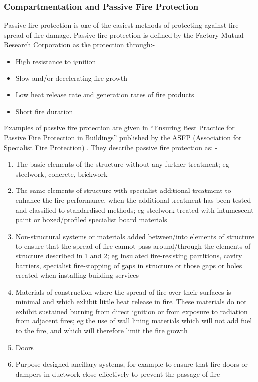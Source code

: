 \documentclass[table,a4paper,oneside]{book}
\begin{document}
\subsubsection{Compartmentation and Passive Fire Protection}
Passive fire protection is one of the easiest methods of protecting against fire spread of fire damage. Passive fire protection is defined by the Factory Mutual Research Corporation \citep{Corporation1991} as the protection through:-
\begin{itemize}
\item High resistance to ignition
\item Slow and/or decelerating fire growth
\item Low heat release rate and generation rates of fire products
\item Short fire duration
\end{itemize}
Examples of passive fire protection are given in ``Ensuring Best Practice for Passive Fire Protection in Buildings'' published by the ASFP (Association for Specialist Fire Protection)  \citep{ASFP2004}. They describe passive fire protection as: -
\begin{enumerate}
\item The basic elements of the structure without any further treatment; eg steelwork, concrete, brickwork
\item The same elements of structure with specialist additional treatment to enhance the fire performance, when the additional treatment has been tested and classified to standardised methods; eg steelwork treated with intumescent paint or boxed/profiled specialist board materials
\item Non-structural systems or materials added between/into elements of structure to ensure that the spread of fire cannot pass around/through the  elements of structure described in 1 and 2; eg insulated fire-resisting partitions, cavity barriers, specialist fire-stopping of gaps in structure or those gaps or holes created when installing building services
\item Materials of construction where the spread of fire over their surfaces is minimal and which exhibit little heat release in fire. These materials do  not exhibit sustained burning from direct ignition or from exposure to radiation from adjacent fires; eg the use of wall lining materials which will not  add fuel to the fire, and which will therefore limit the fire growth
\item Doors
\item Purpose-designed ancillary systems, for example to ensure that fire doors or dampers in ductwork close effectively to prevent the passage of fire
\end{enumerate}
\end{document}
